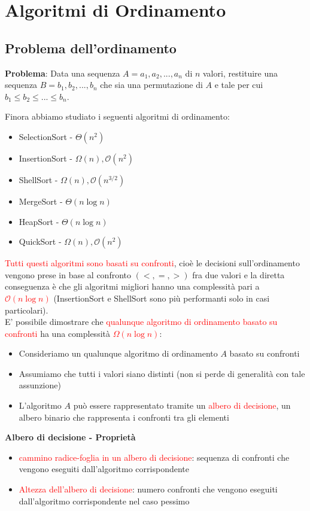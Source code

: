 \documentclass[../cheatSheetAlgoritmi.tex]{subfiles}
\begin{document}
\chapter{Algoritmi di Ordinamento}
\section{Problema dell'ordinamento}
\textbf{Problema}: Data una sequenza $A = a_1, a_2 , ..., a_n$ di $n$ valori, restituire una sequenza $B = b_1 , b_2 , ..., b_n$ che sia una permutazione di $A$ e tale per cui $b_1 \leq b_2 \leq ... \leq b_n$.

Finora abbiamo studiato i seguenti algoritmi di ordinamento:

\begin{itemize}
	\item SelectionSort - $\Theta(n^{2})$
	\item InsertionSort - $\Omega(n), \mathcal{O}(n^{2})$
	\item ShellSort - $\Omega(n), \mathcal{O}(n^{3/2})$
	\item MergeSort - $\Theta(n \log n)$
	\item HeapSort - $\Theta(n \log n)$
	\item QuickSort - $\Omega(n), \mathcal{O}(n^{2})$
\end{itemize} 
\textcolor{red}{Tutti questi algoritmi sono basati su confronti}, cioè le decisioni sull'ordinamento vengono prese in base al confronto $(<, =, >)$ fra due valori e la diretta conseguenza è che gli algoritmi migliori hanno una complessità pari a \textcolor{red}{$\mathcal{O}(n \log n)$} (InsertionSort e ShellSort sono più performanti solo in casi particolari).\\
E' possibile dimostrare che \textcolor{red}{qualunque algoritmo di ordinamento basato su confronti} ha una complessità \textcolor{red}{$\Omega(n \log n)$}:
\begin{itemize}
	\item Consideriamo un qualunque algoritmo di ordinamento $A$ basato su confronti
	\item Assumiamo che tutti i valori siano distinti (non si perde di generalità con tale assunzione)
	\item L'algoritmo $A$ può essere rappresentato tramite un \textcolor{red}{albero di decisione}, un albero binario che rappresenta i confronti tra gli elementi
\end{itemize}
\textbf{Albero di decisione - Proprietà}
\begin{itemize}
	\item \textcolor{red}{cammino radice-foglia in un albero di decisione}: sequenza di confronti che vengono eseguiti dall'algoritmo corrispondente
	\item \textcolor{red}{Altezza dell'albero di decisione}: numero confronti che vengono eseguiti dall'algoritmo corrispondente nel caso pessimo
\end{itemize}
\end{document}
